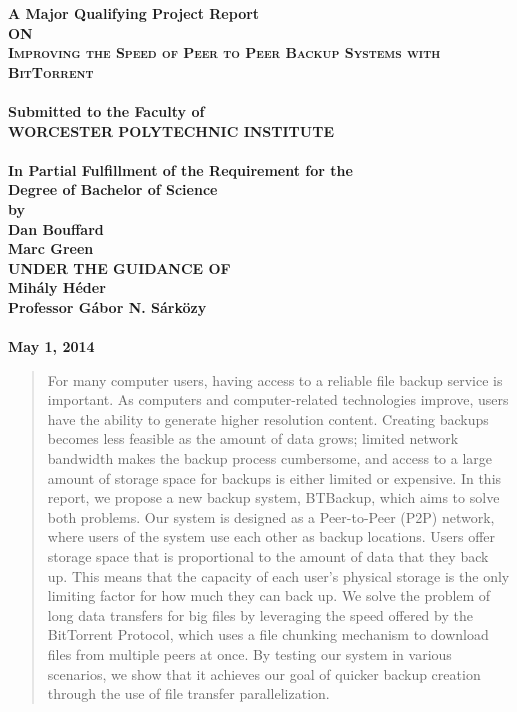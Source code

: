 \documentclass[12pt]{report}
\begin{document}
\begin{titlepage}
\begin{center}
\thispagestyle{empty}
\Large{\textbf{A Major Qualifying Project Report\\ \large{ON}}}\\[1.75cm]
\LARGE{\textsc {\textbf{Improving the Speed of Peer to Peer Backup Systems with BitTorrent}}}\\[0.5cm]
\vspace{0.25cm}
\Large{\textbf{\\Submitted to the Faculty of }}
\LARGE{\textbf{\\WORCESTER POLYTECHNIC INSTITUTE\\}}
\vspace{0.5cm}
\Large{\textbf{\\In Partial Fulfillment of the Requirement for the}}
\Large{\textbf{\\Degree of Bachelor of Science}}
\vspace{0.5cm}
\Large{\textbf{\\by}}\\[0.75cm]
\large{\textbf{Dan Bouffard}}\\
\large{\textbf{Marc Green}}\\
\vspace{1cm}
\large{\textbf{UNDER THE GUIDANCE OF}}\\
\vspace{.25cm}
\large{\textbf{Mih\'aly H\'eder}}\\
\large{\textbf{Professor G\'abor N. S\'ark\"ozy}}\\
\vspace{1cm}
\large{\textbf{\\May 1, 2014}}\\
\end{center}
\end{titlepage}

\begin{abstract}
For many computer users, having access to a reliable file backup service is important. As computers and computer-related technologies improve, users have the ability to generate higher resolution content. Creating backups becomes less feasible as the amount of data grows; limited network bandwidth makes the backup process cumbersome, and access to a large amount of storage space for backups is either limited or expensive. In this report, we propose a new backup system, BTBackup, which aims to solve both problems. Our system is designed as a Peer-to-Peer (P2P) network, where users of the system use each other as backup locations. Users offer storage space that is proportional to the amount of data that they back up. This means that the capacity of each user's physical storage is the only limiting factor for how much they can back up. We solve the problem of long data transfers for big files by leveraging the speed offered by the BitTorrent Protocol, which uses a file chunking mechanism to download files from multiple peers at once. By testing our system in various scenarios, we show that it achieves our goal of quicker backup creation through the use of file transfer parallelization.
\end{abstract}
\end{document}
